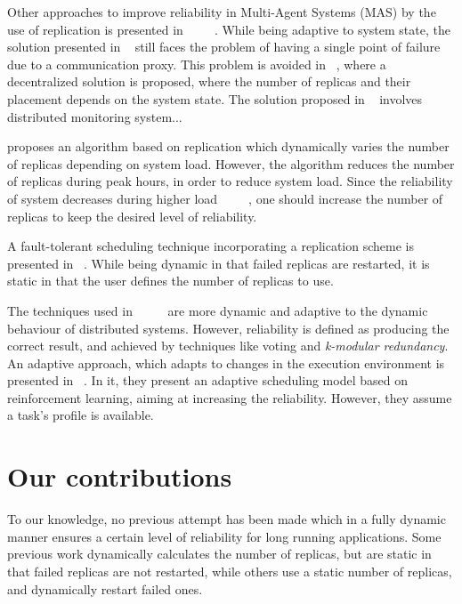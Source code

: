 \documentclass{cslthse-msc}
\begin{document}
Other approaches to improve reliability in Multi-Agent Systems (MAS) by the use of replication is presented in ~\cite{replicatingAgents} ~\cite{adaptiveMASReplication} ~\cite{adaptiveAgentReplication}. While being adaptive to system state, the solution presented in ~\cite{replicatingAgents} still faces the problem of having a single point of failure due to a communication proxy. This problem is avoided in ~\cite{adaptiveMASReplication}, where a decentralized solution is proposed, where the number of replicas and their placement depends on the system state. %
The solution proposed in ~\cite{adaptiveAgentReplication} involves distributed monitoring system...  %

\cite{adaptiveCheckPointAndRep} proposes an algorithm based on replication which dynamically varies the number of replicas depending on system load. However, the algorithm reduces the number of replicas during peak hours, in order to reduce system load. Since the reliability of system decreases during higher load ~\cite{studyOfFailures} ~\cite{studyOfFailures} ~\cite{implicationsOfFailures}, one should increase the number of replicas to keep the desired level of reliability.

A fault-tolerant scheduling technique incorporating a replication scheme is presented in ~\cite{faultTolerantSchedPolicy}. While being dynamic in that failed replicas are restarted, it is static in that the user defines the number of replicas to use.

The techniques used in ~\cite{selfAdaptRel} ~\cite{dynAdaptRepl} ~\cite{relModelWebServices} are more dynamic and adaptive to the dynamic behaviour of distributed systems. However, reliability is defined as producing the correct result, and achieved by techniques like voting and \emph{k-modular redundancy}.
An adaptive approach, which adapts to changes in the execution environment is presented in ~\cite{imprRelAdaptRL}. In it, they present an adaptive scheduling model based on reinforcement learning, aiming at increasing the reliability. However, they assume a task's profile is available.


\section{Our contributions} \label{sec:introduction_contributions}
To our knowledge, no previous attempt has been made which in a fully dynamic manner ensures a certain level of reliability for long running applications. Some previous work dynamically calculates the number of replicas, but are static in that failed replicas are not restarted, while others use a static number of replicas, and dynamically restart failed ones.
\end{document}
